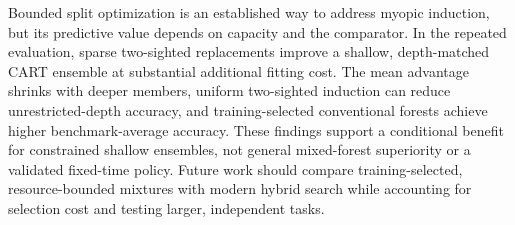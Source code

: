 Bounded split optimization is an established way to address myopic induction, but its predictive value depends on capacity and the comparator. In the repeated evaluation, sparse two-sighted replacements improve a shallow, depth-matched CART ensemble at substantial additional fitting cost. The mean advantage shrinks with deeper members, uniform two-sighted induction can reduce unrestricted-depth accuracy, and training-selected conventional forests achieve higher benchmark-average accuracy. These findings support a conditional benefit for constrained shallow ensembles, not general mixed-forest superiority or a validated fixed-time policy. Future work should compare training-selected, resource-bounded mixtures with modern hybrid search while accounting for selection cost and testing larger, independent tasks.
